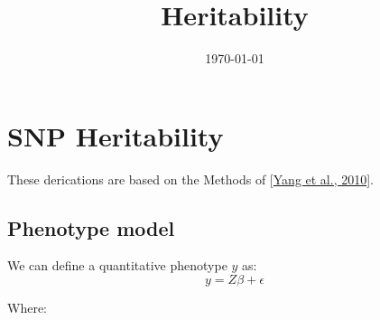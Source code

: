 \documentclass[12pt]{article}
\title{Heritability}
\date{\today}
\begin{document}
\maketitle

\section{SNP Heritability}
These derications are based on the Methods of [\href{https://www.nature.com/articles/ng.608}{Yang et al., 2010}]. 

\subsection{Phenotype model}
We can define a quantitative phenotype $y$ as:
$$ y = Z \beta + \epsilon $$

Where:
\end{document}
